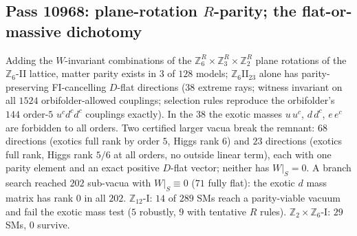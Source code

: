 \subsection{Pass 10968: plane-rotation $R$-parity; the flat-or-massive dichotomy}

Adding the $W$-invariant combinations of the $\mathbb{Z}_6^R\times\mathbb{Z}_3^R\times\mathbb{Z}_2^R$ plane rotations of the
$\mathbb{Z}_6$-II lattice, matter parity exists in $3$ of $128$ models; $\mathbb{Z}_6$II$_{23}$ alone has parity-preserving
FI-cancelling $D$-flat directions ($38$ extreme rays; witness invariant on all $1524$ orbifolder-allowed couplings;
selection rules reproduce the orbifolder's $144$ order-$5$ $u^cd^cd^c$ couplings exactly).  In the $38$ the exotic
masses $u\,u^c$, $d\,d^c$, $e\,e^c$ are forbidden to all orders.  Two certified larger vacua break the remnant: $68$
directions (exotics full rank by order $5$, Higgs rank $6$) and $23$ directions (exotics full rank, Higgs rank $5/6$
at all orders, no outside linear term), each with one parity element and an exact positive $D$-flat vector; neither
has $W|_S=0$.  A branch search reached $202$ sub-vacua with $W|_S\equiv0$ ($71$ fully flat): the exotic $d$ mass matrix
has rank $0$ in all $202$.  $\mathbb{Z}_{12}$-I: $14$ of $289$ SMs reach a parity-viable vacuum and fail the exotic
mass test ($5$ robustly, $9$ with tentative $R$ rules).  $\mathbb{Z}_2\times\mathbb{Z}_6$-I: $29$ SMs, $0$ survive.
